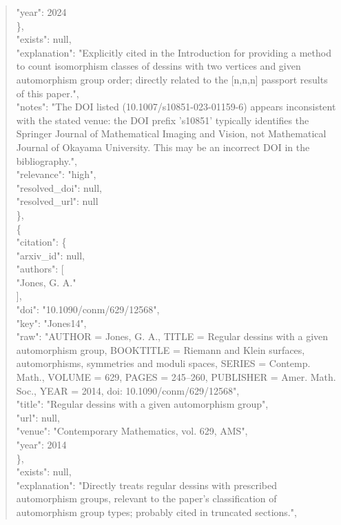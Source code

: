 \documentclass[11pt]{article}
\begin{document}
\begin{quote}
        "year": 2024\\
      \},\\
      "exists": null,\\
      "explanation": "Explicitly cited in the Introduction for providing a method to count isomorphism classes of dessins with two vertices and given automorphism group order; directly related to the [n,n,n] passport results of this paper.",\\
      "notes": "The DOI listed (10.1007/s10851-023-01159-6) appears inconsistent with the stated venue: the DOI prefix 's10851' typically identifies the Springer Journal of Mathematical Imaging and Vision, not Mathematical Journal of Okayama University. This may be an incorrect DOI in the bibliography.",\\
      "relevance": "high",\\
      "resolved\_doi": null,\\
      "resolved\_url": null\\
    \},\\
    \{\\
      "citation": \{\\
        "arxiv\_id": null,\\
        "authors": [\\
          "Jones, G. A."\\
        ],\\
        "doi": "10.1090/conm/629/12568",\\
        "key": "Jones14",\\
        "raw": "AUTHOR = Jones, G. A., TITLE = Regular dessins with a given automorphism group, BOOKTITLE = Riemann and Klein surfaces, automorphisms, symmetries and moduli spaces, SERIES = Contemp. Math., VOLUME = 629, PAGES = 245--260, PUBLISHER = Amer. Math. Soc., YEAR = 2014, doi: 10.1090/conm/629/12568",\\
        "title": "Regular dessins with a given automorphism group",\\
        "url": null,\\
        "venue": "Contemporary Mathematics, vol. 629, AMS",\\
        "year": 2014\\
      \},\\
      "exists": null,\\
      "explanation": "Directly treats regular dessins with prescribed automorphism groups, relevant to the paper's classification of automorphism group types; probably cited in truncated sections.",\\

\end{quote}
\end{document}
